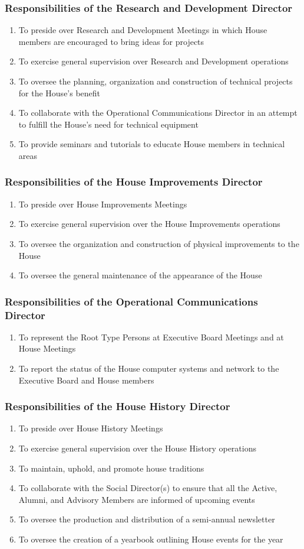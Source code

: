 \documentclass{article}
\newcommand{\asubsection}[1]{\subsubsection{#1} \label{#1}}
\begin{document}
\asubsection{Responsibilities of the Research and Development Director}
\begin{enumerate}
	\item To preside over Research and Development Meetings in which House members are encouraged to bring ideas for projects
	\item To exercise general supervision over Research and Development operations
	\item To oversee the planning, organization and construction of technical projects for the House's benefit
	\item To collaborate with the Operational Communications Director in an attempt to fulfill the House's need for technical equipment
	\item To provide seminars and tutorials to educate House members in technical areas
\end{enumerate}

\asubsection{Responsibilities of the House Improvements Director}
\begin{enumerate}
	\item To preside over House Improvements Meetings
	\item To exercise general supervision over the House Improvements operations
	\item To oversee the organization and construction of physical improvements to the House
	\item To oversee the general maintenance of the appearance of the House
\end{enumerate}

\asubsection{Responsibilities of the Operational Communications Director}
\begin{enumerate}
	\item To represent the Root Type Persons at Executive Board Meetings and at House Meetings
	\item To report the status of the House computer systems and network to the Executive Board and House members
\end{enumerate}

\asubsection{Responsibilities of the House History Director}
\begin{enumerate}
	\item To preside over House History Meetings
	\item To exercise general supervision over the House History operations
	\item To maintain, uphold, and promote house traditions
	\item To collaborate with the Social Director(s) to ensure that all the Active, Alumni, and Advisory Members are informed of upcoming events
	\item To oversee the production and distribution of a semi-annual newsletter
	\item To oversee the creation of a yearbook outlining House events for the year
\end{enumerate}
\end{document}
